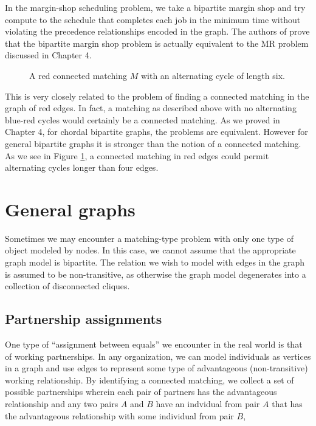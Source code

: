 In the margin-shop scheduling problem, we take a bipartite margin shop and try compute to the schedule that completes each job in the minimum time without violating the precedence relationships encoded in the graph.  The authors of \cite{OST} prove that the bipartite margin shop problem is actually equivalent to the MR problem discussed in Chapter 4.


\begin{figure}
	\begin{center}
	
	\end{center}
	\caption{A red connected matching $M$ with an alternating cycle of length six.}
	\label{rb_cexp}
\end{figure}
This is very closely related to the problem of finding a connected matching in the graph of red edges.  In fact, a matching as described above with no alternating blue-red cycles would certainly be a connected matching.  As we proved in Chapter 4, for chordal bipartite graphs, the problems are equivalent.  However for general bipartite graphs it is stronger than the notion of a connected matching.  As we see in Figure \ref{rb_cexp}, a connected matching in red edges could permit alternating cycles longer than four edges.  

\section{General graphs}

Sometimes we may encounter a matching-type problem with only one type of object modeled by nodes.  In this case, we cannot assume that the appropriate graph model is bipartite.  The relation we wish to model with edges in the graph is assumed to be non-transitive, as otherwise the graph model degenerates into a collection of disconnected cliques.
	\subsection{Partnership assignments}
One type of ``assignment between equals'' we encounter in the real world is that of working partnerships.  In any organization, we can model individuals as vertices in a graph and use edges to represent some type of advantageous (non-transitive) working relationship.  By identifying a connected matching, we collect a set of possible partnerships wherein each pair of partners has the advantageous relationship and any two pairs $A$ and $B$ have an indvidual from pair $A$ that has the advantageous relationship with some individual from pair $B$,

